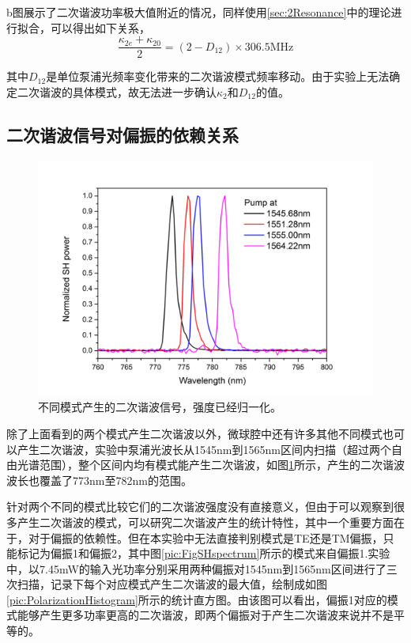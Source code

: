 \documentclass[UTF8,a4paper,cs4size,hyperref]{ctexart}
\begin{document}
b图展示了二次谐波功率极大值附近的情况，同样使用\ref{sec:2Resonance}中的理论进行拟合，可以得出如下关系，
\begin{equation}
\frac{\kappa_{2e}+\kappa_{20}}{2} = (2-D_{12})\times 306.5\mathrm{ MHz}
\end{equation}

其中$D_{12}$是单位泵浦光频率变化带来的二次谐波模式频率移动。由于实验上无法确定二次谐波的具体模式，故无法进一步确认$\kappa_2$和$D_{12}$的值。

\subsection{二次谐波信号对偏振的依赖关系}

\begin{figure}
\centering
\includegraphics[width=14cm ]{FigSHexamples}
\caption{不同模式产生的二次谐波信号，强度已经归一化。}
\label{pic:FigSHexamples}
\end{figure}

除了上面看到的两个模式产生二次谐波以外，微球腔中还有许多其他不同模式也可以产生二次谐波，实验中泵浦光波长从1545nm到1565nm区间内扫描（超过两个自由光谱范围），整个区间内均有模式能产生二次谐波，如图\ref{pic:FigSHexamples}所示，产生的二次谐波波长也覆盖了773nm至782nm的范围。

针对两个不同的模式比较它们的二次谐波强度没有直接意义，但由于可以观察到很多产生二次谐波的模式，可以研究二次谐波产生的统计特性，其中一个重要方面在于，对于偏振的依赖性。但在本实验中无法直接判别模式是TE还是TM偏振，只能标记为偏振1和偏振2，其中图\ref{pic:FigSHspectrum}所示的模式来自偏振1.实验中，以7.45mW的输入光功率分别采用两种偏振对1545nm到1565nm区间进行了三次扫描，记录下每个对应模式产生二次谐波的最大值，绘制成如图\ref{pic:PolarizationHistogram}所示的统计直方图。由该图可以看出，偏振1对应的模式能够产生更多功率更高的二次谐波，即两个偏振对于产生二次谐波来说并不是平等的。
\end{document}
